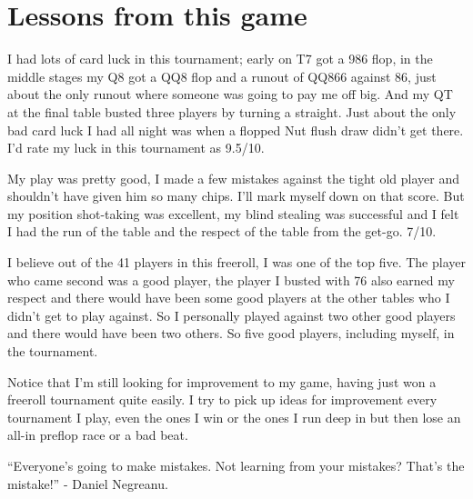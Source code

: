 \section{Lessons from this game}

I had lots of card luck in this tournament; early on T7 got a 986 flop,
in the middle stages my Q8 got a QQ8 flop and a runout of QQ866 against
86, just about the only runout where someone was going to pay me off big.
And my QT at the final table busted three players by turning a straight.
Just about the only bad card luck I had all night was when a flopped
Nut flush draw didn't get there. I'd rate my luck in this tournament
as 9.5/10.

My play was pretty good, I made a few mistakes against the tight old
player and shouldn't have given him so many chips. I'll mark myself
down on that score. But my position shot-taking was excellent, my blind
stealing was successful and I felt I had the run of the table and
the respect of the table from the get-go. 7/10.

I believe out of the 41 players in this freeroll, I was one of
the top five. The player who came second was a good player, the player
I busted with 76 also earned my respect and there would have been
some good players at the other tables who I didn't get to play
against. So I personally played against two other good players
and there would have been two others. So five good players,
including myself, in the tournament.

Notice that I'm still looking for improvement to my game, having just
won a freeroll tournament quite easily. I try to pick up
ideas for improvement every tournament I play, even
the ones I win or the ones I run deep in but then lose an all-in
preflop race or a bad beat.

``Everyone's going to make mistakes. Not learning from your mistakes?
That's the mistake!'' - Daniel Negreanu.
